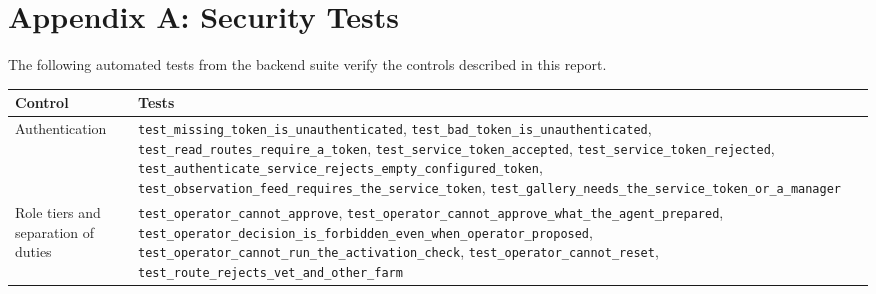 \documentclass[11pt,letterpaper]{article}
\begin{document}
\appendix
\section{Appendix A: Security Tests}
\label{app:tests}

The following automated tests from the backend suite verify the controls described in this report.

\begin{table}[H]
\centering
\footnotesize
\begin{tabularx}{\textwidth}{>{\raggedright\arraybackslash}p{4.2cm}X}
\toprule
Control & Tests \\
\midrule
Authentication & \texttt{test\_\allowbreak{}missing\_\allowbreak{}token\_\allowbreak{}is\_\allowbreak{}unauthenticated}, \texttt{test\_\allowbreak{}bad\_\allowbreak{}token\_\allowbreak{}is\_\allowbreak{}unauthenticated}, \texttt{test\_\allowbreak{}read\_\allowbreak{}routes\_\allowbreak{}require\_\allowbreak{}a\_\allowbreak{}token}, \texttt{test\_\allowbreak{}service\_\allowbreak{}token\_\allowbreak{}accepted}, \texttt{test\_\allowbreak{}service\_\allowbreak{}token\_\allowbreak{}rejected}, \texttt{test\_\allowbreak{}authenticate\_\allowbreak{}service\_\allowbreak{}rejects\_\allowbreak{}empty\_\allowbreak{}configured\_\allowbreak{}token}, \texttt{test\_\allowbreak{}observation\_\allowbreak{}feed\_\allowbreak{}requires\_\allowbreak{}the\_\allowbreak{}service\_\allowbreak{}token}, \texttt{test\_\allowbreak{}gallery\_\allowbreak{}needs\_\allowbreak{}the\_\allowbreak{}service\_\allowbreak{}token\_\allowbreak{}or\_\allowbreak{}a\_\allowbreak{}manager} \\
Role tiers and separation of duties & \texttt{test\_\allowbreak{}operator\_\allowbreak{}cannot\_\allowbreak{}approve}, \texttt{test\_\allowbreak{}operator\_\allowbreak{}cannot\_\allowbreak{}approve\_\allowbreak{}what\_\allowbreak{}the\_\allowbreak{}agent\_\allowbreak{}prepared}, \texttt{test\_\allowbreak{}operator\_\allowbreak{}decision\_\allowbreak{}is\_\allowbreak{}forbidden\_\allowbreak{}even\_\allowbreak{}when\_\allowbreak{}operator\_\allowbreak{}proposed}, \texttt{test\_\allowbreak{}operator\_\allowbreak{}cannot\_\allowbreak{}run\_\allowbreak{}the\_\allowbreak{}activation\_\allowbreak{}check}, \texttt{test\_\allowbreak{}operator\_\allowbreak{}cannot\_\allowbreak{}reset}, \texttt{test\_\allowbreak{}route\_\allowbreak{}rejects\_\allowbreak{}vet\_\allowbreak{}and\_\allowbreak{}other\_\allowbreak{}farm} \\

\end{tabularx}
\end{table}
\end{document}
